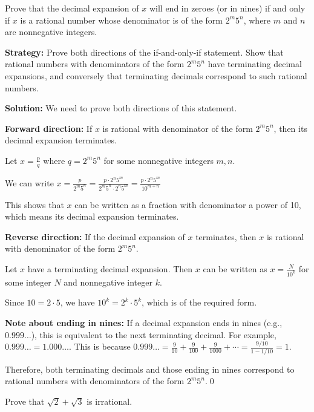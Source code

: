 \begin{problembox}
\begin{problemstatement}
Prove that the decimal expansion of $x$ will end in zeroes (or in nines) if and only if $x$ is a rational number whose denominator is of the form $2^m 5^n$, where $m$ and $n$ are nonnegative integers.
\end{problemstatement}
\end{problembox}

\noindent\textbf{Strategy:} Prove both directions of the if-and-only-if statement. Show that rational numbers with denominators of the form $2^m 5^n$ have terminating decimal expansions, and conversely that terminating decimals correspond to such rational numbers.

\bigskip\noindent\textbf{Solution:}
We need to prove both directions of this statement.

\textbf{Forward direction:} If $x$ is rational with denominator of the form $2^m 5^n$, then its decimal expansion terminates.

Let $x = \frac{p}{q}$ where $q = 2^m 5^n$ for some nonnegative integers $m, n$.

We can write $x = \frac{p}{2^m 5^n} = \frac{p \cdot 2^n 5^m}{2^m 5^n \cdot 2^n 5^m} = \frac{p \cdot 2^n 5^m}{10^{m+n}}$

This shows that $x$ can be written as a fraction with denominator a power of 10, which means its decimal expansion terminates.

\textbf{Reverse direction:} If the decimal expansion of $x$ terminates, then $x$ is rational with denominator of the form $2^m 5^n$.

Let $x$ have a terminating decimal expansion. Then $x$ can be written as $x = \frac{N}{10^k}$ for some integer $N$ and nonnegative integer $k$.

Since $10 = 2 \cdot 5$, we have $10^k = 2^k \cdot 5^k$, which is of the required form.

\textbf{Note about ending in nines:}
If a decimal expansion ends in nines (e.g., $0.999\ldots$), this is equivalent to the next terminating decimal. For example, $0.999\ldots = 1.000\ldots$. This is because $0.999\ldots = \frac{9}{10} + \frac{9}{100} + \frac{9}{1000} + \cdots = \frac{9/10}{1 - 1/10} = 1$.

Therefore, both terminating decimals and those ending in nines correspond to rational numbers with denominators of the form $2^m 5^n$.\qed


\begin{problembox}
\begin{problemstatement}
Prove that $\sqrt{2} + \sqrt{3}$ is irrational.
\end{problemstatement}
\end{problembox}

